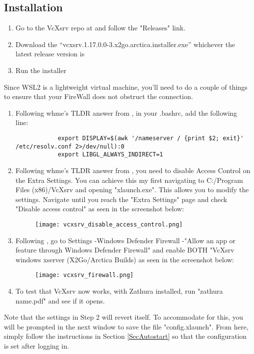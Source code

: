 \subsection{Installation}
\begin{enumerate}
    \item Go to the VcXsrv repo at \cite{articaproject2019vcxsrv} and follow the
        "Releases" link.
    \item Download the ``vcxsrv.1.17.0.0-3.x2go.arctica.installer.exe''
        whichever the latest release version is
    \item Run the installer
\end{enumerate}
Since WSL2 is a lightweight virtual machine, you'll need to do a couple of
things to ensure that your FireWall does not obstruct the connection.
\begin{enumerate}
    \item Following whme's TLDR answer from \cite{whme2020how}, in your .bashrc,
        add the following line:
        \begin{lstlisting}
            export DISPLAY=$(awk '/nameserver / {print $2; exit}' /etc/resolv.conf 2>/dev/null):0
            export LIBGL_ALWAYS_INDIRECT=1
        \end{lstlisting}
    \item Following whme's TLDR answer from \cite{whme2020how}, you need to
        disable Access Control on the Extra Settings. You can achieve this my
        first navigating to C:/Program Files (x86)/VcXsrv and opening
        "xlaunch.exe". This allows you to modify the settings. Navigate until
        you reach the "Extra Settings" page and check "Disable access control"
        as seen in the screenshot below:
        \begin{figure}[H]
            \centering
            \texttt{[image: vcxsrv\_disable\_access\_control.png]}
        \end{figure}
    \item Following \cite{alextsil2020steps}, go to Settings -\trangle Windows
        Defender Firewall -\trangle "Allow an app or feature through Windows
        Defender Firewall" and enable BOTH "VcXsrv windows xserver (X2Go/Arctica
        Builds) as seen in the screenshot below:
        \begin{figure}[H]
            \centering
            \texttt{[image: vcxsrv\_firewall.png]}
        \end{figure}
    \item To test that VcXsrv now works, with Zathura installed, run "zathura
        name.pdf" and see if it opens.
\end{enumerate}
Note that the settings in Step 2 will revert itself. To accommodate for this,
you will be prompted in the next window to save the file "config.xlaunch". From
here, simply follow the instructions in Section \ref{SecAutostart} so that the
configuration is set after logging in.

